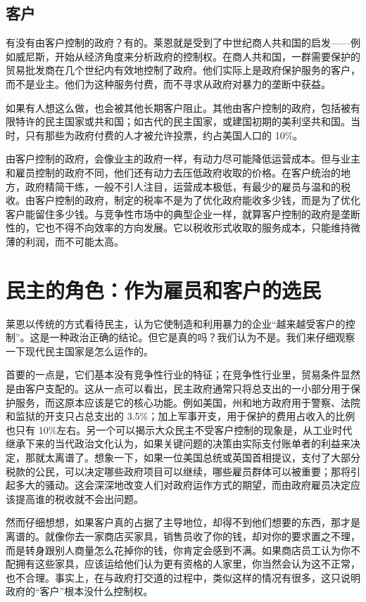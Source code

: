 \subsection{客户}
有没有由客户控制的政府？有的。莱恩就是受到了中世纪商人共和国的启发——例如威尼斯，开始从经济角度来分析政府的控制权。在商人共和国，一群需要保护的贸易批发商在几个世纪内有效地控制了政府。他们实际上是政府保护服务的客户，而不是业主。他们为这种服务付费，而不寻求从政府对暴力的垄断中获益。

如果有人想这么做，也会被其他长期客户阻止。其他由客户控制的政府，包括被有限特许的民主国家或共和国；如古代的民主国家，或建国初期的美利坚共和国。当时，只有那些为政府付费的人才被允许投票，约占美国人口的 10\%。

由客户控制的政府，会像业主的政府一样，有动力尽可能降低运营成本。但与业主和雇员控制的政府不同，他们还有动力去压低政府收取的价格。在客户统治的地方，政府精简干练，一般不引人注目，运营成本极低，有最少的雇员与温和的税收。由客户控制的政府，制定的税率不是为了优化政府能收多少钱，而是为了优化客户能留住多少钱。与竞争性市场中的典型企业一样，就算客户控制的政府是垄断性的，它也不得不向效率的方向发展。它以税收形式收取的服务成本，只能维持微薄的利润，而不可能太高。

\section{民主的角色：作为雇员和客户的选民}
莱恩以传统的方式看待民主，认为它使制造和利用暴力的企业“越来越受客户的控制”。这是一种政治正确的结论。但它是真的吗？我们认为不是。我们来仔细观察一下现代民主国家是怎么运作的。

首要的一点是，它们基本没有竞争性行业的特征；在竞争性行业里，贸易条件显然是由客户支配的。这从一点可以看出，民主政府通常只将总支出的一小部分用于保护服务，而这原本应该是它的核心功能。例如美国，州和地方政府用于警察、法院和监狱的开支只占总支出的 3.5\%；加上军事开支，用于保护的费用占收入的比例也只有 10\%左右。另一个可以揭示大众民主不受客户控制的现象是，从工业时代继承下来的当代政治文化认为，如果关键问题的决策由实际支付账单者的利益来决定，那就太离谱了。想象一下，如果一位美国总统或英国首相提议，支付了大部分税款的公民，可以决定哪些政府项目可以继续，哪些雇员群体可以被重要；那将引起多大的骚动。这会深深地改变人们对政府运作方式的期望，而由政府雇员决定应该提高谁的税收就不会出问题。

然而仔细想想，如果客户真的占据了主导地位，却得不到他们想要的东西，那才是离谱的。就像你去一家商店买家具，销售员收了你的钱，却对你的要求置之不理，而是转身跟别人商量怎么花掉你的钱，你肯定会感到不满。如果商店员工认为你不配拥有这些家具，应该运给他们认为更有资格的人家里，你当然会认为这不正常，也不合理。事实上，在与政府打交道的过程中，类似这样的情况有很多，这只说明政府的“客户”根本没什么控制权。

